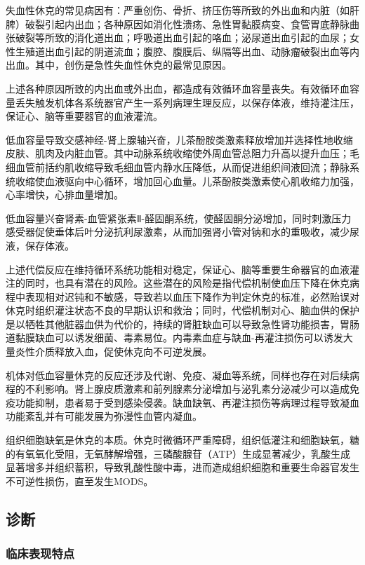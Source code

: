失血性休克的常见病因有：严重创伤、骨折、挤压伤等所致的外出血和内脏（如肝脾）破裂引起内出血；各种原因如消化性溃疡、急性胃黏膜病变、食管胃底静脉曲张破裂等所致的消化道出血；呼吸道出血引起的咯血；泌尿道出血引起的血尿；女性生殖道出血引起的阴道流血；腹腔、腹膜后、纵隔等出血、动脉瘤破裂出血等内出血。其中，创伤是急性失血性休克的最常见原因。

上述各种原因所致的内出血或外出血，都造成有效循环血容量丧失。有效循环血容量丢失触发机体各系统器官产生一系列病理生理反应，以保存体液，维持灌注压，保证心、脑等重要器官的血液灌流。

低血容量导致交感神经-肾上腺轴兴奋，儿茶酚胺类激素释放增加并选择性地收缩皮肤、肌肉及内脏血管。其中动脉系统收缩使外周血管总阻力升高以提升血压；毛细血管前括约肌收缩导致毛细血管内静水压降低，从而促进组织间液回流；静脉系统收缩使血液驱向中心循环，增加回心血量。儿茶酚胺类激素使心肌收缩力加强，心率增快，心排血量增加。

低血容量兴奋肾素-血管紧张素Ⅱ-醛固酮系统，使醛固酮分泌增加，同时刺激压力感受器促使垂体后叶分泌抗利尿激素，从而加强肾小管对钠和水的重吸收，减少尿液，保存体液。

上述代偿反应在维持循环系统功能相对稳定，保证心、脑等重要生命器官的血液灌注的同时，也具有潜在的风险。这些潜在的风险是指代偿机制使血压下降在休克病程中表现相对迟钝和不敏感，导致若以血压下降作为判定休克的标准，必然贻误对休克时组织灌注状态不良的早期认识和救治；同时，代偿机制对心、脑血供的保护是以牺牲其他脏器血供为代价的，持续的肾脏缺血可以导致急性肾功能损害，胃肠道黏膜缺血可以诱发细菌、毒素易位。内毒素血症与缺血-再灌注损伤可以诱发大量炎性介质释放入血，促使休克向不可逆发展。

机体对低血容量休克的反应还涉及代谢、免疫、凝血等系统，同样也存在对后续病程的不利影响。肾上腺皮质激素和前列腺素分泌增加与泌乳素分泌减少可以造成免疫功能抑制，患者易于受到感染侵袭。缺血缺氧、再灌注损伤等病理过程导致凝血功能紊乱并有可能发展为弥漫性血管内凝血。

组织细胞缺氧是休克的本质。休克时微循环严重障碍，组织低灌注和细胞缺氧，糖的有氧氧化受阻，无氧酵解增强，三磷酸腺苷（ATP）生成显著减少，乳酸生成显著增多并组织蓄积，导致乳酸性酸中毒，进而造成组织细胞和重要生命器官发生不可逆性损伤，直至发生MODS。

\subsection{诊断}

\subsubsection{临床表现特点}


